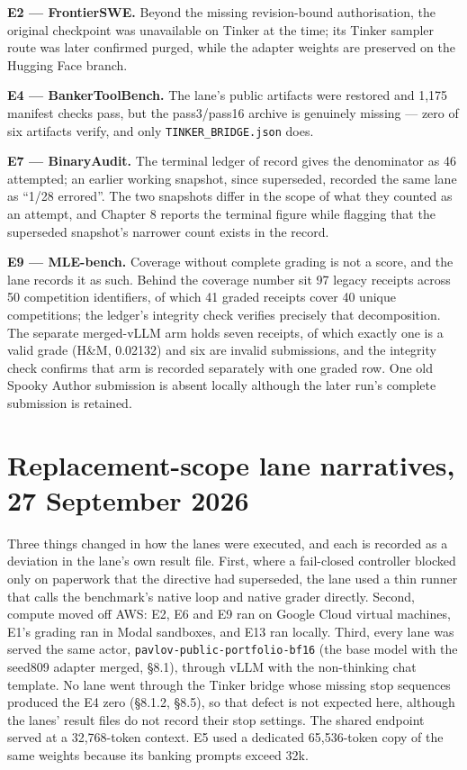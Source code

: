 \documentclass[12pt,a4paper]{report}
\begin{document}
\textbf{E2 --- FrontierSWE.} Beyond the missing revision-bound
authorisation, the original checkpoint was unavailable on Tinker at the
time; its Tinker sampler route was later confirmed purged, while the
adapter weights are preserved on the Hugging Face branch.

\textbf{E4 --- BankerToolBench.} The lane's public artifacts were
restored and 1,175 manifest checks pass, but the pass3/pass16 archive is
genuinely missing --- zero of six artifacts verify, and only
\texttt{TINKER\_BRIDGE.json} does.

\textbf{E7 --- BinaryAudit.} The terminal ledger of record gives the
denominator as 46 attempted; an earlier working snapshot, since
superseded, recorded the same lane as ``1/28 errored''. The two
snapshots differ in the scope of what they counted as an attempt, and
Chapter 8 reports the terminal figure while flagging that the superseded
snapshot's narrower count exists in the record.

\textbf{E9 --- MLE-bench.} Coverage without complete grading is not a
score, and the lane records it as such. Behind the coverage number sit
97 legacy receipts across 50 competition identifiers, of which 41 graded
receipts cover 40 unique competitions; the ledger's integrity check
verifies precisely that decomposition. The separate merged-vLLM arm
holds seven receipts, of which exactly one is a valid grade (H\&M,
0.02132) and six are invalid submissions, and the integrity check
confirms that arm is recorded separately with one graded row. One old
Spooky Author submission is absent locally although the later run's
complete submission is retained.

\section{Replacement-scope lane narratives, 27 September
2026}\label{replacement-scope-lane-narratives-27-september-2026}

Three things changed in how the lanes were executed, and each is
recorded as a deviation in the lane's own result file. First, where a
fail-closed controller blocked only on paperwork that the directive had
superseded, the lane used a thin runner that calls the benchmark's
native loop and native grader directly. Second, compute moved off AWS:
E2, E6 and E9 ran on Google Cloud virtual machines, E1's grading ran in
Modal sandboxes, and E13 ran locally. Third, every lane was served the
same actor, \texttt{pavlov-public-portfolio-bf16} (the base model with
the seed809 adapter merged, §8.1), through vLLM with the non-thinking
chat template. No lane went through the Tinker bridge whose missing stop
sequences produced the E4 zero (§8.1.2, §8.5), so that defect is not
expected here, although the lanes' result files do not record their stop
settings. The shared endpoint served at a 32,768-token context. E5 used
a dedicated 65,536-token copy of the same weights because its banking
prompts exceed 32k.
\end{document}
